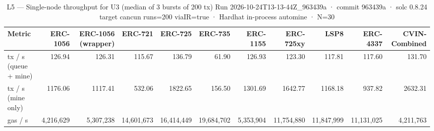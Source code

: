 \begin{table}[ht]
\centering
\small
\begin{tabular}{lrrrrrrrrrr}
\toprule
Metric & ERC-1056 & ERC-1056 (wrapper) & ERC-721 & ERC-725 & ERC-735 & ERC-1155 & ERC-725xy & LSP8 & ERC-4337 & CVIN-Combined \\
\midrule
tx / s (queue + mine) & 126.94 & 126.31 & 115.67 & 136.79 & 61.90 & 126.93 & 123.30 & 117.81 & 117.60 & 131.70 \\
tx / s (mine only) & 1176.06 & 1117.41 & 532.06 & 1822.65 & 156.50 & 1301.69 & 1642.77 & 1168.18 & 937.82 & 2632.31 \\
gas / s & 4,216,629 & 5,307,238 & 14,601,673 & 16,414,449 & 19,684,702 & 5,353,904 & 11,754,880 & 11,847,999 & 11,131,025 & 4,211,763 \\
\bottomrule
\end{tabular}
\caption{L5 — Single-node throughput for U3 (median of 3 bursts of 200 tx) Run 2026-10-24T13-13-44Z\_963439a · commit 963439a · solc 0.8.24 target cancun runs=200 viaIR=true · Hardhat in-process automine · N=30}
\label{tab:throughput}
\end{table}
